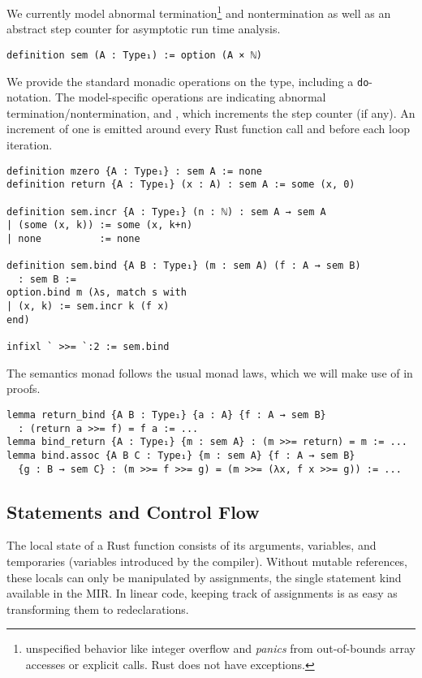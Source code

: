 We currently model abnormal termination\footnote{unspecified behavior like integer
overflow and \emph{panics} from out-of-bounds array accesses or explicit 
calls. Rust does not have exceptions.} and
nontermination as well as an abstract step counter for asymptotic run time analysis.

\begin{verbatim}
definition sem (A : Type₁) := option (A × ℕ)
\end{verbatim}

We provide the standard monadic operations on the type, including a
\texttt{do}-notation. The model-specific operations are 
indicating abnormal termination/nontermination, and , which
increments the step counter (if any). An increment of one is emitted around
every Rust function call and before each loop iteration.

\begin{verbatim}
definition mzero {A : Type₁} : sem A := none
definition return {A : Type₁} (x : A) : sem A := some (x, 0)

definition sem.incr {A : Type₁} (n : ℕ) : sem A → sem A
| (some (x, k)) := some (x, k+n)
| none          := none

definition sem.bind {A B : Type₁} (m : sem A) (f : A → sem B)
  : sem B :=
option.bind m (λs, match s with
| (x, k) := sem.incr k (f x)
end)

infixl ` >>= `:2 := sem.bind
\end{verbatim}

The semantics monad follows the usual monad laws, which we will make use of in proofs.

\begin{verbatim}
lemma return_bind {A B : Type₁} {a : A} {f : A → sem B}
  : (return a >>= f) = f a := ...
lemma bind_return {A : Type₁} {m : sem A} : (m >>= return) = m := ...
lemma bind.assoc {A B C : Type₁} {m : sem A} {f : A → sem B}
  {g : B → sem C} : (m >>= f >>= g) = (m >>= (λx, f x >>= g)) := ...
\end{verbatim}

\subsection{Statements and Control Flow}

The local state of a Rust function consists of its arguments, variables, and
temporaries (variables introduced by the compiler). Without mutable references,
these locals can only be manipulated by assignments, the single statement kind
available in the MIR. In linear code, keeping track of assignments is as easy as
transforming them to redeclarations.

